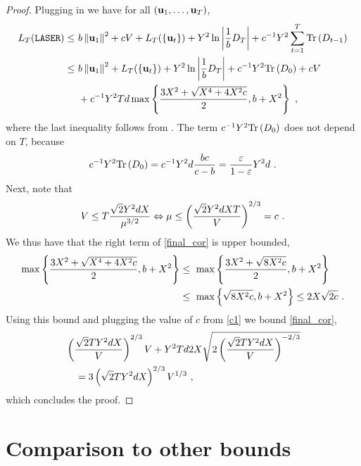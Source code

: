 \begin{proof}
Plugging  in  we have for
all $(\mathbf{u}_{1} , \ldots , \mathbf{u}_{T})$,
\begin{align}
L_T(\texttt{LASER})
 \leq~&  b\left\Vert
    \vui{1}\right\Vert ^{2}+c V+L_T(\{\vui{t}\})+Y^{2} \ln\left|\frac{1}{b}D_{T}\right|+c^{-1}Y^2 \sum_{t=1}^{T} \tr\paren{D_{t-1}} \nonumber\\
\leq~ &
  b\left\Vert
     \vui{1}\right\Vert ^{2}+L_T(\{\vui{t}\})+Y^{2}
   \ln\left|\frac{1}{b}D_{T}\right|+c^{-1}Y^2\tr\paren{D_0}+c V \nonumber \\
& +c^{-1}Y^2 T d  \max\braces{ \frac{3X^2 +
   \sqrt{X^4+4X^2 c}}{2},b+X^2}~,\nonumber%
\end{align}
where the last inequality follows from .
%
The term $c^{-1}Y^2{\rm Tr}\left({D_0}\right)$ does not depend on $T$, because
\[
c^{-1}Y^2{\rm Tr}\left({D_0}\right)=c^{-1}Y^2d\frac{bc}{c-b}=\frac{\varepsilon}{1-\varepsilon}Y^{2}d~.
\]
Next, note that
\[
V \leq T \frac{\sqrt{2}Y^2dX}{\mu^{3/2}} \Leftrightarrow \mu \leq  \left({\frac{\sqrt{2}Y^2dXT}{V}}\right)^{2/3}=c~.
\]
We thus have that the right term of \eqref{final_cor} is upper bounded,
\begin{align*}
\max\left\{{  \frac{ 3X^2 +
   \sqrt{ X^4+4X^2 c } }{ 2 },b+X^2 }\right\}
& \leq~  \max\left\{{  \frac{ 3X^2 +
   \sqrt{ 8X^2 c } }{ 2 },b+X^2 }\right\}\\
&    \leq~
\max\left\{{  \sqrt{ 8X^2 c },b+X^2 }\right\}
\leq 2X\sqrt{ 2c } ~.
\end{align*}
Using this bound and plugging the value of $c$ from \eqref{c1} we bound
\eqref{final_cor},
\begin{align*}
&\left({\frac{\sqrt{2}T Y^2 d X}{V}}\right)^{2/3} V + Y^2 T d 2X
\sqrt{2 \left({\frac{\sqrt{2}T Y^2 d X}{V}}\right)^{-2/3}}\\
& \quad=
3\left({\sqrt{2}T Y^2 d X}\right)^{2/3} V^{1/3} ~,
\end{align*}
which concludes the proof.
\QED
\end{proof}

\section{Comparison to other bounds}

